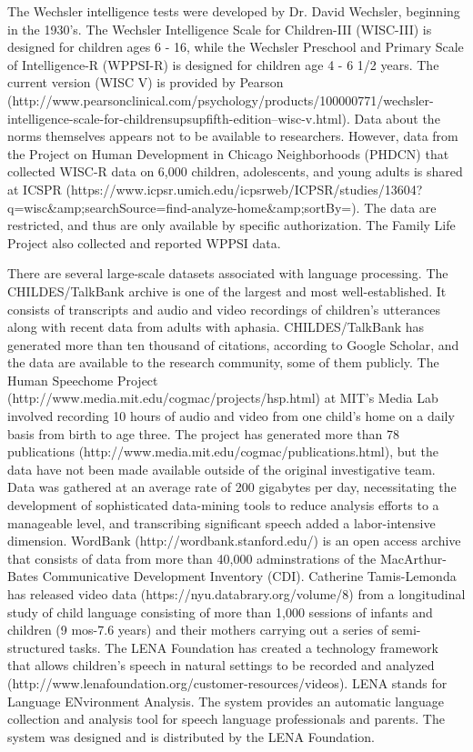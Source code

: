 \documentclass[letterpaper,man,apacite]{apa6}
\begin{document}
The Wechsler intelligence tests were developed by Dr. David Wechsler, beginning in the 1930's. The Wechsler Intelligence Scale for Children-III (WISC-III) is designed for children ages 6 - 16, while the Wechsler Preschool and Primary Scale of Intelligence-R (WPPSI-R) is designed for children age 4 - 6 1/2 years.
The current version (WISC V) is provided by Pearson (http://www.pearsonclinical.com/psychology/products/100000771/wechsler-intelligence-scale-for-childrensupsupfifth-edition--wisc-v.html).
Data about the norms themselves appears not to be available to researchers.
However, data from the Project on Human Development in Chicago Neighborhoods (PHDCN) that collected WISC-R data on 6,000 children, adolescents, and young adults is shared at ICSPR (https://www.icpsr.umich.edu/icpsrweb/ICPSR/studies/13604?q=wisc&amp;searchSource=find-analyze-home&amp;sortBy=). 
The data are restricted, and thus are only available by specific authorization.
The Family Life Project also collected and reported WPPSI data.

There are several large-scale datasets associated with language processing.
The CHILDES/TalkBank \cite{macwhinney_childes_2001} archive is one of the largest and most well-established.
It consists of transcripts and audio and video recordings of children's utterances along with recent data from adults with aphasia.
CHILDES/TalkBank has generated more than ten thousand of citations, according to Google Scholar, and the data are available to the research community, some of them publicly.
The Human Speechome Project (http://www.media.mit.edu/cogmac/projects/hsp.html) at MIT's Media Lab involved recording 10 hours of audio and video from one child's home on a daily basis from birth to age three.
The project has generated more than 78 publications (http://www.media.mit.edu/cogmac/publications.html), but the data have not been made available outside of the original investigative team.
Data was gathered at an average rate of 200 gigabytes per day, necessitating the development of sophisticated data-mining tools to reduce analysis efforts to a manageable level, and transcribing significant speech added a labor-intensive dimension.
WordBank (http://wordbank.stanford.edu/) is an open access archive that consists of data from more than 40,000 adminstrations of the MacArthur-Bates Communicative Development Inventory (CDI).
Catherine Tamis-Lemonda has released video data (https://nyu.databrary.org/volume/8) from a longitudinal study of child language consisting of more than 1,000 sessions of infants and children (9 mos-7.6 years) and their mothers carrying out a series of semi-structured tasks.
The LENA Foundation has created a technology framework that allows children's speech in natural settings to be recorded and analyzed (http://www.lenafoundation.org/customer-resources/videos).
LENA stands for Language ENvironment Analysis.
The system provides an automatic language collection and analysis tool for speech language professionals and parents.
The system was designed and is distributed by the LENA Foundation.
\end{document}
